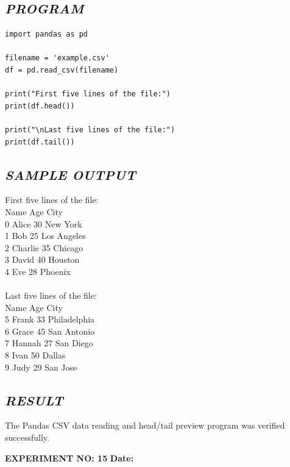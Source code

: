 \documentclass[11pt,a4paper]{article}
\begin{document}
\subsection*{\textit{PROGRAM}}
\begin{lstlisting}[style=pythonstyle]
import pandas as pd 
 
filename = 'example.csv' 
df = pd.read_csv(filename) 
 
print("First five lines of the file:") 
print(df.head()) 
 
print("\nLast five lines of the file:") 
print(df.tail())
\end{lstlisting}

\subsection*{\textit{SAMPLE OUTPUT}}
\begin{tcolorbox}[colback=black!85,colframe=navyblue,title=\textbf{Terminal Output},coltitle=white,fonttitle=\bfseries\small]
\small\ttfamily\color{green!30!white}
First five lines of the file:\\
      Name  Age         City\\
0    Alice   30     New York\\
1      Bob   25  Los Angeles\\
2  Charlie   35      Chicago\\
3    David   40      Houston\\
4      Eve   28      Phoenix\\
\\
Last five lines of the file:\\
     Name  Age         City\\
5   Frank   33  Philadelphia\\
6   Grace   45   San Antonio\\
7  Hannah   27     San Diego\\
8    Ivan   50        Dallas\\
9    Judy   29      San Jose
\end{tcolorbox}

\subsection*{\textit{RESULT}}
The Pandas CSV data reading and head/tail preview program was verified successfully.

\newpage

\noindent
\textbf{\large EXPERIMENT NO: 15} \hfill \textbf{\large Date: \underline{\hspace{3cm}}}
\end{document}
